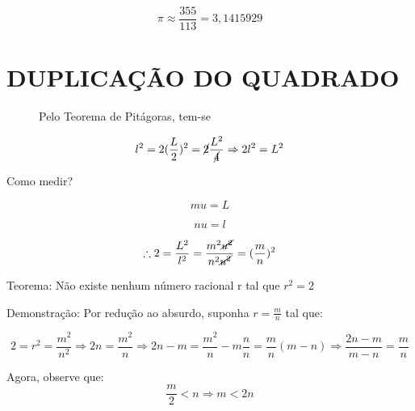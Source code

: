 \documentclass[a4paper, 12pt]{article}
\begin{document}
\[\pi \approx \frac{355}{113} = 3,1415929\]

\newpage

\section{DUPLICAÇÃO DO QUADRADO}

\begin{figure} [h!]
    \begin{minipage}[!] {0.4\linewidth}
    \end{minipage}
    \begin{minipage}[!] {0.4\linewidth}
        {Pelo Teorema de Pitágoras, tem-se}

        \[l^2 = 2 (\frac{L}{2})^2 = \cancel{2} \frac{L^2}{\cancel{4}} \Rightarrow 2l^2 = L^2\] \newline

    \end{minipage}
\end{figure} 

{Como medir?}

\[mu = L\]

\[nu = l\]

\[\therefore 2 = \frac{L^2}{l^2} = \frac{m^2 \cancel{u^2}}{n^2 \cancel{u^2}} = (\frac{m}{n})^2\]

{Teorema: Não existe nenhum número racional r tal que $r^2 = 2$}

{Demonstração: Por redução ao absurdo, suponha $r= \frac{m}{n}$ tal que:}

\[2=r^2 = \frac{m^2}{n^2} \Rightarrow 2n = \frac{m^2}{n} \Rightarrow 2n - m = \frac{m^2}{n} - m\frac{n}{n} = \frac{m}{n} (m-n) \Rightarrow \frac{2n-m}{m-n} = \frac{m}{n}\]

{Agora, observe que:}
\[\frac{m}{2} < n \Rightarrow m < 2n\]
\end{document}
